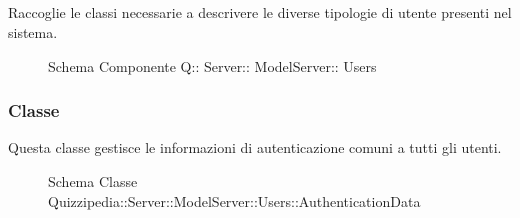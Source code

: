 \subsection{}
Raccoglie le classi necessarie a descrivere le diverse tipologie di utente presenti nel sistema.
\begin{figure}[H]
\centering
\noindent{}
\caption[Schema Componente Quizzipedia::Server::ModelServer::Users]{Schema Componente Q:: Server:: ModelServer:: Users}
\end{figure}
\subsubsection{Classe }
Questa classe gestisce le informazioni di autenticazione comuni a tutti gli utenti.
\begin{figure}[H]
\centering
\noindent{}
\caption[Schema Classe AuthenticationData]{Schema Classe Quizzipedia::Server::ModelServer::Users::AuthenticationData}
\end{figure}
